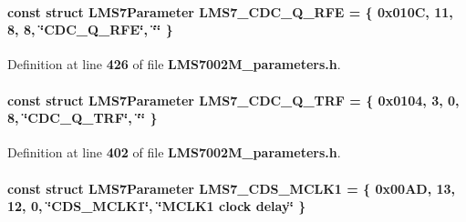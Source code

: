 \paragraph[{L\+M\+S7\+\_\+\+C\+D\+C\+\_\+\+Q\+\_\+\+R\+FE}]{\setlength{\rightskip}{0pt plus 5cm}const struct {\bf L\+M\+S7\+Parameter} L\+M\+S7\+\_\+\+C\+D\+C\+\_\+\+Q\+\_\+\+R\+FE = \{ 0x010\+C, 11, 8, 8, \char`\"{}\+C\+D\+C\+\_\+\+Q\+\_\+\+R\+F\+E\char`\"{}, \char`\"{}\char`\"{} \}\hspace{0.3cm}{\ttfamily [static]}}\label{LMS7002M__parameters_8h_a163c678a56eac6d01030702567fb5e05}


Definition at line {\bf 426} of file {\bf L\+M\+S7002\+M\+\_\+parameters.\+h}.

\paragraph[{L\+M\+S7\+\_\+\+C\+D\+C\+\_\+\+Q\+\_\+\+T\+RF}]{\setlength{\rightskip}{0pt plus 5cm}const struct {\bf L\+M\+S7\+Parameter} L\+M\+S7\+\_\+\+C\+D\+C\+\_\+\+Q\+\_\+\+T\+RF = \{ 0x0104, 3, 0, 8, \char`\"{}\+C\+D\+C\+\_\+\+Q\+\_\+\+T\+R\+F\char`\"{}, \char`\"{}\char`\"{} \}\hspace{0.3cm}{\ttfamily [static]}}\label{LMS7002M__parameters_8h_a8d92fdeb4395989d7af6d33ba32f6e98}


Definition at line {\bf 402} of file {\bf L\+M\+S7002\+M\+\_\+parameters.\+h}.

\paragraph[{L\+M\+S7\+\_\+\+C\+D\+S\+\_\+\+M\+C\+L\+K1}]{\setlength{\rightskip}{0pt plus 5cm}const struct {\bf L\+M\+S7\+Parameter} L\+M\+S7\+\_\+\+C\+D\+S\+\_\+\+M\+C\+L\+K1 = \{ 0x00\+A\+D, 13, 12, 0, \char`\"{}\+C\+D\+S\+\_\+\+M\+C\+L\+K1\char`\"{}, \char`\"{}\+M\+C\+L\+K1 clock delay\char`\"{} \}\hspace{0.3cm}{\ttfamily [static]}}\label{LMS7002M__parameters_8h_ab0243eaec3c5e1fe853ca508d7e7cc61}


